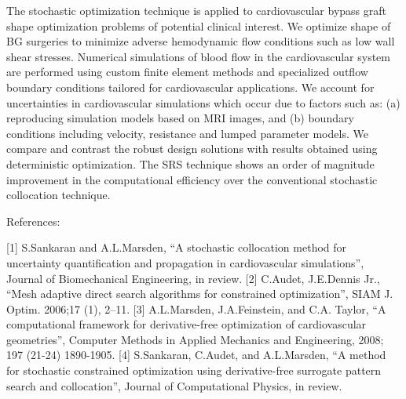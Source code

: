 \documentclass{report}
\begin{document}
The stochastic optimization technique is applied to cardiovascular bypass
graft shape optimization problems of potential clinical interest. We
optimize shape of BG surgeries to minimize adverse hemodynamic flow
conditions such as low wall shear stresses. Numerical simulations of
blood flow in the cardiovascular system are performed using custom finite
element methods and specialized outflow boundary conditions tailored for
cardiovascular applications. We account for uncertainties in
cardiovascular simulations which occur due to factors such as: (a)
reproducing simulation models based on MRI images, and (b) boundary
conditions including velocity, resistance and lumped parameter models. We
compare and contrast the robust design solutions with results obtained
using deterministic optimization. The SRS technique shows an order of
magnitude improvement in the computational efficiency over the
conventional stochastic collocation technique.

References:

[1] S.Sankaran and A.L.Marsden, ``A stochastic collocation method for
uncertainty quantification and propagation in cardiovascular
simulations'', Journal of Biomechanical Engineering, in review.
[2] C.Audet, J.E.Dennis Jr., ``Mesh adaptive direct search algorithms for
constrained optimization'', SIAM J. Optim. 2006;17 (1), 2--11.
[3] A.L.Marsden, J.A.Feinstein, and C.A. Taylor, ``A computational
framework for derivative-free optimization of cardiovascular geometries'',
Computer Methods in Applied Mechanics and Engineering, 2008; 197 (21-24)
1890-1905.
[4] S.Sankaran, C.Audet, and A.L.Marsden, ``A method for stochastic
constrained optimization using derivative-free surrogate pattern search
and collocation'', Journal of Computational Physics, in review.
\end{document}
